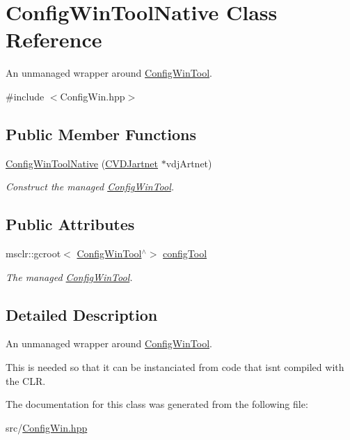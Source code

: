 \hypertarget{classConfigWinToolNative}{}\section{Config\+Win\+Tool\+Native Class Reference}
\label{classConfigWinToolNative}


An unmanaged wrapper around \hyperlink{classConfigWinTool}{Config\+Win\+Tool}.  




{\ttfamily \#include $<$Config\+Win.\+hpp$>$}

\subsection*{Public Member Functions}
\begin{DoxyCompactItemize}
\item 
\mbox{\label{classConfigWinToolNative_a7042b5af4bdfe4dc1b8fbfb156c4b188}} 
\hyperlink{classConfigWinToolNative_a7042b5af4bdfe4dc1b8fbfb156c4b188}{Config\+Win\+Tool\+Native} (\hyperlink{classCVDJartnet}{C\+V\+D\+Jartnet} $\ast$vdj\+Artnet)
\begin{DoxyCompactList}\small\item\em Construct the managed \hyperlink{classConfigWinTool}{Config\+Win\+Tool}. \end{DoxyCompactList}\end{DoxyCompactItemize}
\subsection*{Public Attributes}
\begin{DoxyCompactItemize}
\item 
\mbox{\label{classConfigWinToolNative_a8bdff36b89c6091b360b75866c4da346}} 
msclr\+::gcroot$<$ \hyperlink{classConfigWinTool}{Config\+Win\+Tool}$^\wedge$$>$ \hyperlink{classConfigWinToolNative_a8bdff36b89c6091b360b75866c4da346}{config\+Tool}
\begin{DoxyCompactList}\small\item\em The managed \hyperlink{classConfigWinTool}{Config\+Win\+Tool}. \end{DoxyCompactList}\end{DoxyCompactItemize}


\subsection{Detailed Description}
An unmanaged wrapper around \hyperlink{classConfigWinTool}{Config\+Win\+Tool}. 

This is needed so that it can be instanciated from code that isn\textquotesingle{}t compiled with the C\+LR. 

The documentation for this class was generated from the following file\+:\begin{DoxyCompactItemize}
\item 
src/\hyperlink{ConfigWin_8hpp}{Config\+Win.\+hpp}\end{DoxyCompactItemize}

